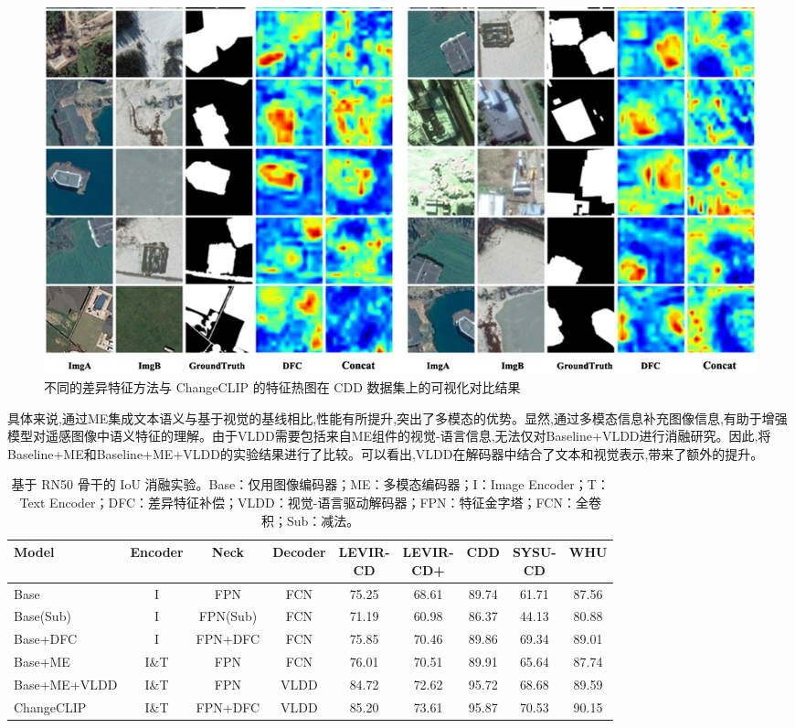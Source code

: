 \begin{figure}[!htbp]
  \centering
  \includegraphics[width=\textwidth]{paper_figures/基于AI基础模型微调的变化检测模型研究/ChangeCLIP/changeclip_hotmap.png}
  \caption{不同的差异特征方法与 ChangeCLIP 的特征热图在 CDD 数据集上的可视化对比结果}
  \label{fig:changeclip_hotmap}
\end{figure}

具体来说,通过ME集成文本语义与基于视觉的基线相比,性能有所提升,突出了多模态的优势。显然,通过多模态信息补充图像信息,有助于增强模型对遥感图像中语义特征的理解。由于VLDD需要包括来自ME组件的视觉-语言信息,无法仅对Baseline+VLDD进行消融研究。因此,将Baseline+ME和Baseline+ME+VLDD的实验结果进行了比较。可以看出,VLDD在解码器中结合了文本和视觉表示,带来了额外的提升。

\begin{table}[!htb]
\centering
\small
\setlength{\tabcolsep}{2pt} %
\caption{基于 RN50 骨干的 IoU 消融实验。Base：仅用图像编码器；ME：多模态编码器；I：Image Encoder；T：Text Encoder；DFC：差异特征补偿；VLDD：视觉-语言驱动解码器；FPN：特征金字塔；FCN：全卷积；Sub：减法。}
\label{tab:changeclip_ablation_resnet}
\begin{tabular}{@{}l c c c *{5}{c}@{}}
\toprule
\textbf{Model} & \textbf{Encoder} & \textbf{Neck} & \textbf{Decoder} &
\makecell{\textbf{LEVIR-}\\\textbf{CD}} &
\makecell{\textbf{LEVIR-}\\\textbf{CD+}} &
\textbf{CDD} &
\makecell{\textbf{SYSU-}\\\textbf{CD}} &
\textbf{WHU} \\
\midrule
Base            & I     & FPN       & FCN  & 75.25 & 68.61 & 89.74 & 61.71 & 87.56 \\
Base(Sub)       & I     & FPN(Sub)  & FCN  & 71.19 & 60.98 & 86.37 & 44.13 & 80.88 \\
Base+DFC        & I     & FPN+DFC   & FCN  & 75.85 & 70.46 & 89.86 & 69.34 & 89.01 \\
Base+ME         & I\&T  & FPN       & FCN  & 76.01 & 70.51 & 89.91 & 65.64 & 87.74 \\
Base+ME+VLDD    & I\&T  & FPN       & VLDD & 84.72 & 72.62 & 95.72 & 68.68 & 89.59 \\
ChangeCLIP      & I\&T  & FPN+DFC   & VLDD & 85.20 & 73.61 & 95.87 & 70.53 & 90.15 \\
\bottomrule
\end{tabular}
\end{table}


